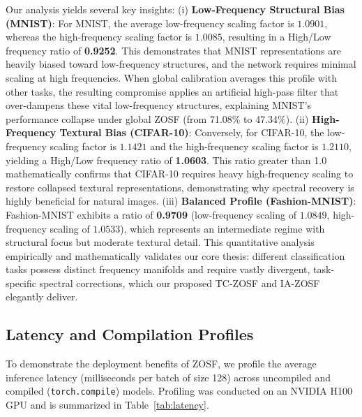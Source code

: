\documentclass{article}
\theoremstyle{plain}
\theoremstyle{definition}
\theoremstyle{remark}
\begin{document}
Our analysis yields several key insights: (i) \textbf{Low-Frequency Structural Bias (MNIST)}: For MNIST, the average low-frequency scaling factor is $1.0901$, whereas the high-frequency scaling factor is $1.0085$, resulting in a High/Low frequency ratio of \textbf{0.9252}. This demonstrates that MNIST representations are heavily biased toward low-frequency structures, and the network requires minimal scaling at high frequencies. When global calibration averages this profile with other tasks, the resulting compromise applies an artificial high-pass filter that over-dampens these vital low-frequency structures, explaining MNIST's performance collapse under global ZOSF (from 71.08\% to 47.34\%). (ii) \textbf{High-Frequency Textural Bias (CIFAR-10)}: Conversely, for CIFAR-10, the low-frequency scaling factor is $1.1421$ and the high-frequency scaling factor is $1.2110$, yielding a High/Low frequency ratio of \textbf{1.0603}. This ratio greater than 1.0 mathematically confirms that CIFAR-10 requires heavy high-frequency scaling to restore collapsed textural representations, demonstrating why spectral recovery is highly beneficial for natural images. (iii) \textbf{Balanced Profile (Fashion-MNIST)}: Fashion-MNIST exhibits a ratio of \textbf{0.9709} (low-frequency scaling of $1.0849$, high-frequency scaling of $1.0533$), which represents an intermediate regime with structural focus but moderate textural detail.
This quantitative analysis empirically and mathematically validates our core thesis: different classification tasks possess distinct frequency manifolds and require vastly divergent, task-specific spectral corrections, which our proposed TC-ZOSF and IA-ZOSF elegantly deliver.

\subsection{Latency and Compilation Profiles}
To demonstrate the deployment benefits of ZOSF, we profile the average inference latency (milliseconds per batch of size 128) across uncompiled and compiled (\texttt{torch.compile}) models. Profiling was conducted on an NVIDIA H100 GPU and is summarized in Table~\ref{tab:latency}.
\end{document}
